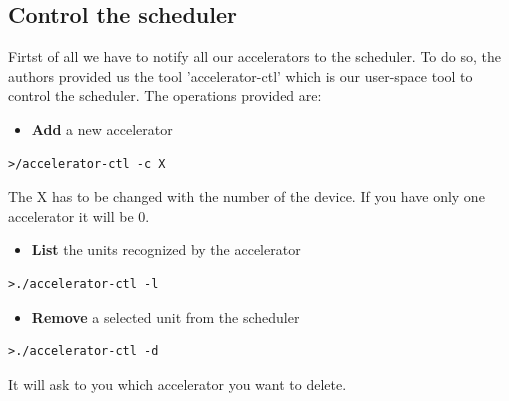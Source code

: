 \documentclass[a4paper,13pt]{article}
\begin{document}
\begin{multicols}{2}
    \subsection{Control the scheduler}
        Firtst of all we have to notify all our accelerators to the scheduler. To do so, the authors provided 
        us the tool 'accelerator-ctl' which is our user-space tool
        to control the scheduler. The operations provided are:
        \begin{itemize}
            \item{{\bf Add} a new accelerator}\\
        \end{itemize}
        \vspace{-2ex}
\begin{lstlisting}
>/accelerator-ctl -c X
\end{lstlisting}
        The X has to be changed with  the number of the device. If you have only one accelerator it will be 0.\\
        \begin{itemize}
            \item{{\bf List} the units recognized by the accelerator}\\
        \end{itemize}
        \vspace{-2ex}
\begin{lstlisting}
>./accelerator-ctl -l
\end{lstlisting}
        \begin{itemize}
            \item{{\bf Remove} a selected unit from the scheduler}\\
        \end{itemize}
        \vspace{-2ex}
\begin{lstlisting}
>./accelerator-ctl -d
\end{lstlisting}
        It will ask to you which accelerator you want to delete.\\

\end{multicols}
\end{document}
